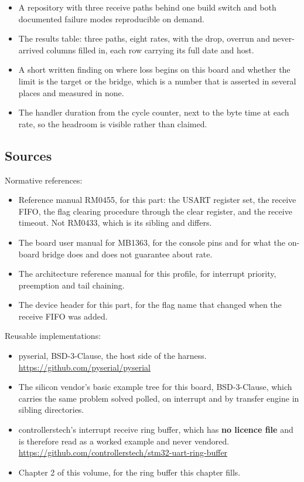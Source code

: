 \begin{itemize}
\item A repository with three receive paths behind one build switch and both
documented failure modes reproducible on demand.
\item The results table: three paths, eight rates, with the drop, overrun and
never-arrived columns filled in, each row carrying its full date and host.
\item A short written finding on where loss begins on this board and whether the
limit is the target or the bridge, which is a number that is asserted in several
places and measured in none.
\item The handler duration from the cycle counter, next to the byte time at each
rate, so the headroom is visible rather than claimed.
\end{itemize}

\subsection*{Sources}

Normative references:
\begin{itemize}
\item Reference manual RM0455, for this part: the USART register set, the
receive FIFO, the flag clearing procedure through the clear register, and the
receive timeout. Not RM0433, which is its sibling and differs.
\item The board user manual for MB1363, for the console pins and for what the
on-board bridge does and does not guarantee about rate.
\item The architecture reference manual for this profile, for interrupt
priority, preemption and tail chaining.
\item The device header for this part, for the flag name that changed when the
receive FIFO was added.
\end{itemize}

Reusable implementations:
\begin{itemize}
\item pyserial, BSD-3-Clause, the host side of the harness.\newline
\url{https://github.com/pyserial/pyserial}
\item The silicon vendor's basic example tree for this board, BSD-3-Clause,
which carries the same problem solved polled, on interrupt and by transfer
engine in sibling directories.
\item controllerstech's interrupt receive ring buffer, which has \textbf{no
licence file} and is therefore read as a worked example and never vendored.\newline
\url{https://github.com/controllerstech/stm32-uart-ring-buffer}
\item Chapter 2 of this volume, for the ring buffer this chapter fills.
\end{itemize}
